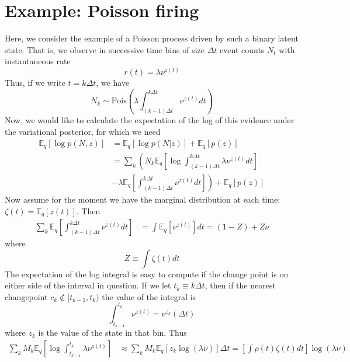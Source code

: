 \documentclass[11pt]{article}
\begin{document}
\section{Example: Poisson firing}
Here, we consider the example of a Poisson process driven by such a binary latent state. That is, we observe in successive time bins of size $\Delta t$ event counts $N_t$ with instantaneous rate
\begin{equation}
    r(t) = \lambda \nu^{z(t)}
\end{equation}
Thus, if we write $t = k\Delta t$, we have
\begin{equation}
    N_k \sim \text{Pois}\left(\lambda \int_{(k - 1)\Delta t}^{k\Delta t} \nu^{z(t)} dt\right)
\end{equation}
Now, we would like to calculate the expectation of the log of this evidence under the variational posterior, for which we need
\begin{align}
    \mathbb{E}_q[\log p(N, z)] &= \mathbb{E}_q[\log p(N|z)] + \mathbb{E}_q[p(z)] \\
    &= \sum_k \left(N_k \mathbb{E}_q \left[ \log \int_{(k - 1)\Delta t}^{k\Delta t} \lambda \nu^{z(t)} dt \right] \right. \\
    &- \left.\lambda \mathbb{E}_q\left[ \int_{(k - 1)\Delta t}^{k\Delta t} \nu^{z(t)} dt\right]\right)
    + \mathbb{E}_q[p(z)]
\end{align}
Now assume for the moment we have the marginal distribution at each time: $\zeta(t) = \mathbb{E}_q[z(t)]$. Then
\begin{align}
    \sum_k \mathbb{E}_q\left[ \int_{(k - 1)\Delta t}^{k\Delta t} \nu^{z(t)} dt\right] &= \int \mathbb{E}_q \left[\nu^{z(t)}\right] dt = (1 - Z) + Z\nu
\end{align}
where
\begin{equation}
    Z \equiv \int \zeta(t) dt
\end{equation}
The expectation of the log integral is easy to compute if the change point is on either side of the interval in question. If we let $t_k \equiv k \Delta t$, then if the nearest changepoint $c_k \notin [t_{k -1}, t_k)$ the value of the integral is
\begin{equation}
    \int_{t_{k - 1}}^{t_k} \nu^{z(t)} = \nu^{z_k}(\Delta t)
\end{equation}
where $z_k$ is the value of the state in that bin. Thus
\begin{align}
    \sum_k M_k \mathbb{E}_q \left[
    \log \int_{t_{k - 1}}^{t_k} \lambda \nu^{z(t)}
    \right]
    &\approx \sum_k M_k \mathbb{E}_q \left[z_k \log (\lambda\nu) \right] \Delta t = \left[\int \rho(t) \zeta(t) dt \right] \log (\lambda \nu)
\end{align}
\end{document}
